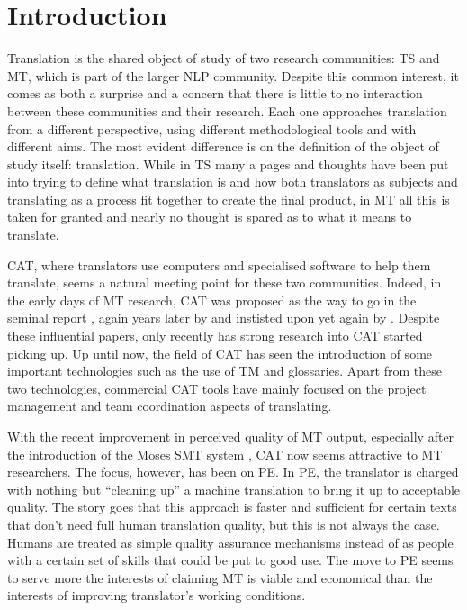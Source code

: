 
\chapter{Introduction} %
\label{ch:introduction} %


\noindent Translation is the shared object of study of two research communities: \ac{TS} and \ac{MT}, which is part of the larger \ac{NLP} community. Despite this common interest, it comes as both a surprise and a concern that there is little to no interaction between these communities and their research. Each one approaches translation from a different perspective, using different methodological tools and with different aims. The most evident difference is on the definition of the object of study itself: translation. While in \ac{TS} many a pages and thoughts have been put into trying to define what translation is and how both translators as subjects and translating as a process fit together to create the final product, in \ac{MT} all this is taken for granted and nearly no thought is spared as to what it means to translate.

\acf{CAT}, where translators use computers and specialised software to help them translate, seems a natural meeting point for these two communities. Indeed, in the early days of \ac{MT} research, \ac{CAT} was proposed as the way to go in the seminal  report \parencite{ALPAC}, again years later by \textcite{kay1980proper} and instisted upon yet again by \textcite{kay1997still}. Despite these influential papers, only recently has strong research into \ac{CAT} started picking up. Up until now, the field of \ac{CAT} has seen the introduction of some important technologies such as the use of \ac{TM} and glossaries. Apart from these two technologies, commercial \ac{CAT} tools have mainly focused on the project management and team coordination aspects of translating.

With the recent improvement in perceived quality of \ac{MT} output, especially after the introduction of the Moses \acs{SMT} system \parencite{koehn2007moses}, \ac{CAT} now seems attractive to \ac{MT} researchers. The focus, however, has been on \acf{PE}. In \ac{PE}, the translator is charged with nothing but ``cleaning up'' a machine translation to bring it up to acceptable quality. The story goes that this approach is faster and sufficient for certain texts that don't need full human translation quality, but this is not always the case. Humans are treated as simple quality assurance mechanisms instead of as people with a certain set of skills that could be put to good use. The move to \ac{PE} seems to serve more the interests of claiming \ac{MT} is viable and economical than the interests of improving translator's working conditions.

